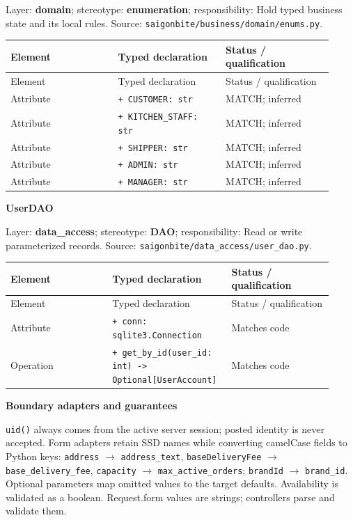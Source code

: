 Layer: \textbf{domain}; stereotype: \textbf{\guillemotleft{}enumeration\guillemotright{}}; responsibility: Hold typed business state and its local rules. Source: \texttt{saigonbite/\allowbreak{}business/\allowbreak{}domain/\allowbreak{}enums.\allowbreak{}py}.

\begin{longtable}{>{\raggedright\arraybackslash}p{0.3067\linewidth}>{\raggedright\arraybackslash}p{0.3067\linewidth}>{\raggedright\arraybackslash}p{0.3067\linewidth}}
Element & Typed declaration & Status / qualification \\
\hline\endfirsthead
Element & Typed declaration & Status / qualification \\
\hline\endhead
Attribute & \texttt{+ CUSTOMER: str} & MATCH; inferred \\
Attribute & \texttt{+ KITCHEN\_\allowbreak{}STAFF: str} & MATCH; inferred \\
Attribute & \texttt{+ SHIPPER: str} & MATCH; inferred \\
Attribute & \texttt{+ ADMIN: str} & MATCH; inferred \\
Attribute & \texttt{+ MANAGER: str} & MATCH; inferred \\
\end{longtable}
\textbf{UserDAO}

Layer: \textbf{data\_access}; stereotype: \textbf{\guillemotleft{}DAO\guillemotright{}}; responsibility: Read or write parameterized records. Source: \texttt{saigonbite/\allowbreak{}data\_\allowbreak{}access/\allowbreak{}user\_\allowbreak{}dao.\allowbreak{}py}.

\begin{longtable}{>{\raggedright\arraybackslash}p{0.3067\linewidth}>{\raggedright\arraybackslash}p{0.3067\linewidth}>{\raggedright\arraybackslash}p{0.3067\linewidth}}
Element & Typed declaration & Status / qualification \\
\hline\endfirsthead
Element & Typed declaration & Status / qualification \\
\hline\endhead
Attribute & \texttt{+ conn: sqlite3.\allowbreak{}Connection} & Matches code \\
Operation & \texttt{+ get\_\allowbreak{}by\_\allowbreak{}id(user\_\allowbreak{}id: int) -\textgreater{} Optional[UserAccount]} & Matches code \\
\end{longtable}
\textbf{Boundary adapters and guarantees}

\texttt{uid()} always comes from the active server session; posted identity is never accepted. Form adapters retain SSD names while converting camelCase fields to Python keys: \texttt{address} \ensuremath{\rightarrow} \texttt{address\_\allowbreak{}text}, \texttt{baseDeliveryFee} \ensuremath{\rightarrow} \texttt{base\_\allowbreak{}delivery\_\allowbreak{}fee}, \texttt{capacity} \ensuremath{\rightarrow} \texttt{max\_\allowbreak{}active\_\allowbreak{}orders}; \texttt{brandId} \ensuremath{\rightarrow} \texttt{brand\_\allowbreak{}id}. Optional parameters map omitted values to the target defaults. Availability is validated as a boolean. Request.form values are strings; controllers parse and validate them.

